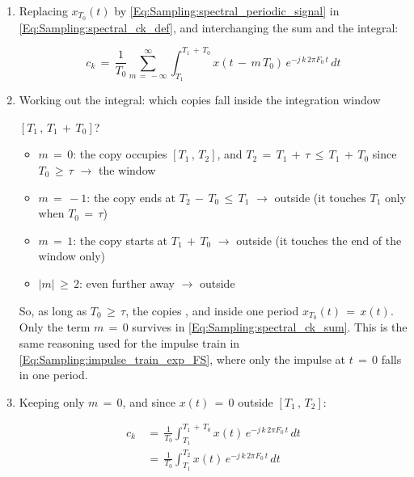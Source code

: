\begin{enumerate}

\item Replacing $x_{T_0}(t)$ by \autoref{Eq:Sampling:spectral_periodic_signal} in \autoref{Eq:Sampling:spectral_ck_def}, and interchanging the sum and the integral:

\begin{equation}
c_k \, = \, \frac{1}{T_0} \sum_{m \, = \, -\infty}^{\infty} \int_{T_1}^{T_1 \, + \, T_0} x(t \, - \, m \, T_0) \, e^{-j \, k \, 2 \pi F_0 \, t} \, dt
\label{Eq:Sampling:spectral_ck_sum}
\end{equation}

\item Working out the integral: which copies fall inside the integration window 

$[T_1 \, , \, T_1 \, + \, T_0]$?

	\begin{itemize}
	\item $m \, = \, 0$: the copy occupies $[T_1 \, , \, T_2]$, and $T_2 \, = \, T_1 \, + \, \tau \, \leq \, T_1 \, + \, T_0$ since $T_0 \, \geq \, \tau$ $\rightarrow$  the window

	\item $m \, = \, -1$: the copy ends at $T_2 \, - \, T_0 \, \leq \, T_1$ $\rightarrow$ outside (it touches $T_1$ only when $T_0 \, = \, \tau$)

	\item $m \, = \, 1$: the copy starts at $T_1 \, + \, T_0$ $\rightarrow$ outside (it touches the end of the window only)

	\item $|m| \, \geq \, 2$: even further away $\rightarrow$ outside
	\end{itemize}

So, as long as $T_0 \, \geq \, \tau$, the copies , and inside one period $x_{T_0}(t) \, = \, x(t)$. Only the term $m \, = \, 0$ survives in \autoref{Eq:Sampling:spectral_ck_sum}. This is the same reasoning used for the impulse train in \autoref{Eq:Sampling:impulse_train_exp_FS}, where only the impulse at $t \, = \, 0$ falls in one period.

\item Keeping only $m \, = \, 0$, and since $x(t) \, = \, 0$ outside $[T_1 \, , \, T_2]$:

\begin{align}
c_k \, &= \, \frac{1}{T_0} \int_{T_1}^{T_1 \, + \, T_0} x(t) \, e^{-j \, k \, 2 \pi F_0 \, t} \, dt \nonumber \\
&= \, \frac{1}{T_0} \int_{T_1}^{T_2} x(t) \, e^{-j \, k \, 2 \pi F_0 \, t} \, dt
\label{Eq:Sampling:spectral_ck_integral}
\end{align}


\end{enumerate}
